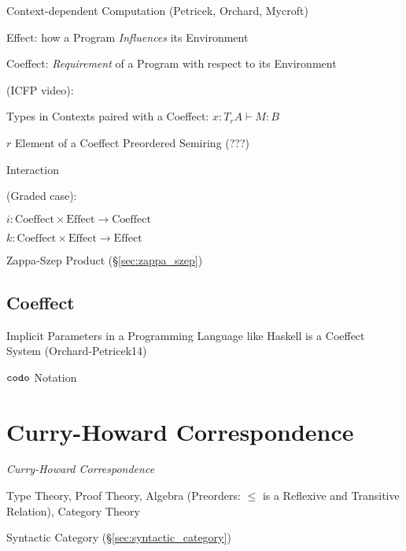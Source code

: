 Context-dependent Computation (Petricek, Orchard, Mycroft)

Effect: how a Program \emph{Influences} its Environment

Coeffect: \emph{Requirement} of a Program with respect to its
Environment

(ICFP video):

Types in Contexts paired with a Coeffect:
$x : T_r A \vdash M : B$

$r$ Element of a Coeffect Preordered Semiring (???) %

Interaction

(Graded case):

$i : \text{Coeffect} \times \text{Effect} \rightarrow \text{Coeffect}$

$k : \text{Coeffect} \times \text{Effect} \rightarrow \text{Effect}$

Zappa-Szep Product (\S\ref{sec:zappa_szep})



\subsection{Coeffect}\label{sec:coeffect}

Implicit Parameters in a Programming Language like Haskell is a
Coeffect System (Orchard-Petricek14)

$\mathtt{codo}$ Notation



\section{Curry-Howard Correspondence}\label{sec:curry_howard}

\emph{Curry-Howard Correspondence}

Type Theory, Proof Theory, Algebra (Preorders: $\leq$ is a Reflexive
and Transitive Relation), Category Theory

Syntactic Category (\S\ref{sec:syntactic_category}) %

